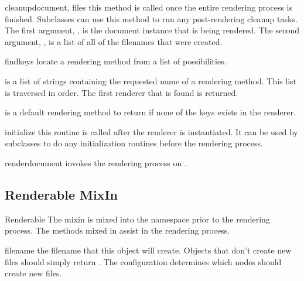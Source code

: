 \begin{methoddesc}[Renderer]{cleanup}{document, files}
this method is called once the entire rendering process is finished.  
Subclasses can use this method to run any post-rendering cleanup tasks.
The first argument, , is the document instance that is
being rendered.  The second argument, , is a list of all of the
filenames that were created.
\end{methoddesc}

\begin{methoddesc}[Renderer]{find}{keys}
locate a rendering method from a list of possibilities.  

 is a list of strings containing the requested name of a
rendering method.  This list is traversed in order.  The first renderer
that is found is returned.

 is a default rendering method to return if none of the keys
exists in the renderer.
\end{methoddesc}

\begin{methoddesc}[Renderer]{initialize}{}
this routine is called after the renderer is instantiated.  It can be used
by subclasses to do any initialization routines before the rendering process.
\end{methoddesc}

\begin{methoddesc}[Renderer]{render}{document}
invokes the rendering process on .
\end{methoddesc}


\subsection{Renderable MixIn}

\begin{classdesc}{Renderable}{}
The  mixin is mixed into the  namespace
prior to the rendering process.  The methods mixed in assist in the 
rendering process.
\end{classdesc}

\begin{memberdesc}[Renderable]{filename}
the filename that this object will create.  Objects that don't create 
new files should simply return .   The configuration determines
which nodes should create new files. 
\end{memberdesc}

